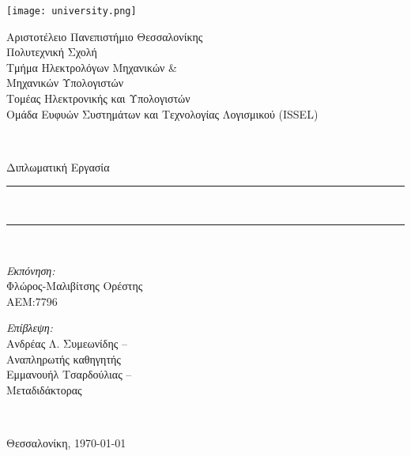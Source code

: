 \begin{titlepage}
    \centering\begin{minipage}{0.3\textwidth}
        \centering\texttt{[image: university.png]}
    \end{minipage}%
    \begin{minipage}{0.7\textwidth}
        \begin{flushleft}
            \large Αριστοτέλειο Πανεπιστήμιο Θεσσαλονίκης\\
            Πολυτεχνική Σχολή\\
            Τμήμα Ηλεκτρολόγων Μηχανικών \&\\Μηχανικών Υπολογιστών\\
            Τομέας Ηλεκτρονικής και Υπολογιστών\\
            Ομάδα Ευφυών Συστημάτων και Τεχνολογίας Λογισμικού (ISSEL)\\[5cm]
        \end{flushleft}
    \end{minipage} \\[1.7cm]

    \begin{center}
        \Large Διπλωματική Εργασία \\[0.8cm]

        \rule{450pt}{4pt} \\[0.4cm]
        \makeatletter{\fontsize{20.26pt}{1em}\selectfont{}\@title{}}\makeatother

        \rule{350pt}{4pt} \\[4cm]

        \noindent\begin{minipage}{0.5\textwidth}
            \begin{flushleft} \large
                \emph{Εκπόνηση:} \\
                Φλώρος-Μαλιβίτσης Ορέστης\\ΑΕΜ:7796\\
            \end{flushleft}
        \end{minipage}\hfill%
        \begin{minipage}{0.5\textwidth}
            \begin{flushright} \large
                \emph{Επίβλεψη:} \\
                Ανδρέας Λ. Συμεωνίδης --\\ Αναπληρωτής καθηγητής\\
                Εμμανουήλ Τσαρδούλιας --\\ Μεταδιδάκτορας
            \end{flushright}
        \end{minipage}
        \\[1cm]
        \vfill

        \large Θεσσαλονίκη, \today{} %
    \end{center}
\end{titlepage}

